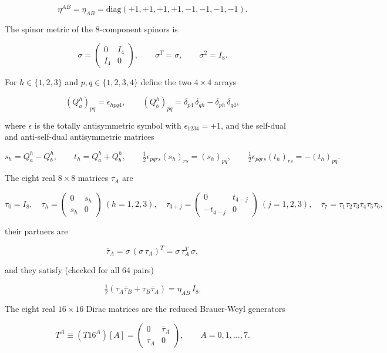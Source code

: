 \documentclass[10pt]{article}
\makeatletter
\newcommand\keepnext{\par\nopagebreak\@nobreaktrue\everypar{\@nobreakfalse\everypar{}}}
\makeatother
\begin{document}
\[
\eta^{AB} = \eta_{AB} = \mathrm{diag}(+1,+1,+1,+1,-1,-1,-1,-1).
\]

The spinor metric of the 8-component spinors is\keepnext


\[
\sigma = \begin{pmatrix} 0 & I_4 \\ I_4 & 0 \end{pmatrix}, \qquad \sigma^T = \sigma, \qquad \sigma^2 = I_8 .
\]

For $h \in \{1,2,3\}$ and $p, q \in \{1,2,3,4\}$ define the two $4\times 4$ arrays\keepnext


\[
(Q_a^{h})_{pq} = \epsilon_{h p q 4}, \qquad (Q_b^{h})_{pq} = \delta_{p4}\,\delta_{qh} - \delta_{ph}\,\delta_{q4},
\]

where $\epsilon$ is the totally antisymmetric symbol with $\epsilon_{1234} = +1$, and the self-dual and anti-self-dual antisymmetric matrices\keepnext


\[
s_h = Q_a^{h} - Q_b^{h}, \qquad t_h = Q_a^{h} + Q_b^{h}, \qquad \tfrac12 \epsilon_{pqrs}(s_h)_{rs} = (s_h)_{pq}, \qquad \tfrac12 \epsilon_{pqrs}(t_h)_{rs} = -(t_h)_{pq}.
\]

The eight real $8\times 8$ matrices $\tau_A$ are\keepnext


\[
\tau_0 = I_8,\quad \tau_h = \begin{pmatrix} 0 & s_h \\ s_h & 0 \end{pmatrix}\ (h=1,2,3),\quad \tau_{3+j} = \begin{pmatrix} 0 & t_{4-j} \\ -t_{4-j} & 0 \end{pmatrix}\ (j=1,2,3),\quad \tau_7 = \tau_1\tau_2\tau_3\tau_4\tau_5\tau_6 ,
\]

their partners are\keepnext


\[
\bar\tau_A = \sigma\,(\sigma\,\tau_A)^T = \sigma\,\tau_A^T\,\sigma ,
\]

and they satisfy (checked for all 64 pairs)\keepnext


\[
\tfrac12\left(\tau_A\bar\tau_B + \tau_B\bar\tau_A\right) = \eta_{AB}\, I_8 .
\]

The eight real $16\times 16$ Dirac matrices are the reduced Brauer-Weyl generators\keepnext


\[
T^A \equiv (T16^A)[A] = \begin{pmatrix} 0 & \bar\tau_A \\ \tau_A & 0 \end{pmatrix}, \qquad A = 0,1,\dots,7 .
\]
\end{document}
